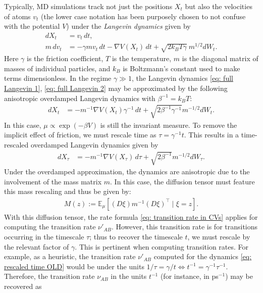 \documentclass[reqno, 12pt]{article}
\begin{document}
Typically, MD simulations track not just the positions $X_t$ but also the velocities of atoms $v_t$ (the lower case notation has been purposely chosen to not confuse with the potential $V$) under the \emph{Langevin dynamics} given by
\begin{align}
    dX_t &= v_t\,dt, \label{eq: full Langevin 1} \\
    m\,dv_t &= -\gamma m v_t\,dt {-} \nabla V(X_t)\,dt + \sqrt{{ 2}k_{B}T\gamma}\:m^{1/2}dW_t. \label{eq: full Langevin 2}
\end{align}
Here $\gamma$ is the friction coefficient, $T$ is the temperature, $m$ is the diagonal matrix of masses of individual particles, and $k_B$ is Boltzmann's constant used to make terms dimensionless. In the regime $\gamma \gg 1$, the Langevin dynamics \eqref{eq: full Langevin 1}, \eqref{eq: full Langevin 2} may be approximated by the following anisotropic overdamped Langevin dynamics with $\beta^{-1} = k_BT $: 
\begin{align}
    dX_t &= {-} m^{-1}\nabla V(X_t)\gamma^{-1}\,dt + \sqrt{2\beta^{-1} \gamma^{-1}}m^{-1/2}dW_t. 
\end{align}
In this case, $\mu \propto \exp(-\beta V)$ is still the invariant measure. To remove the implicit effect of friction, we must rescale time as $\tau = \gamma^{-1}t$. This results in a time-rescaled overdamped Langevin dynamics given by
\begin{align}
    dX_{\tau} &= {-}m^{-1}\nabla V(X_{\tau})\,d\tau + \sqrt{{ 2}\beta^{-1}}m^{-1/2}dW_{\tau}. \label{eq: rescaled time OLD}
\end{align}
Under the overdamped approximation, the dynamics are anisotropic due to the involvement of the mass matrix $m$. In this case, the diffusion tensor must feature this mass rescaling \cite[Eq. 5]{cameron2013estimation} and thus be given by: 
\begin{align}
    M(z) := \mathbb{E}_{\mu}[(D\xi) m^{-1}(D\xi)^{\top} \mid \xi = z].
\end{align}
With this diffusion tensor, the rate formula \eqref{eq: transition rate in CVs} applies for computing the transition rate $\nu'_{AB}$. However, this transition rate is for transitions occurring in the timescale $\tau$; thus to recover the timescale $t$, we must rescale by the relevant factor of $\gamma$. This is pertinent when computing transition rates. For example, as a heuristic, the transition rate $\nu'_{AB}$ computed for the dynamics \eqref{eq: rescaled time OLD} would be under the units $1/\tau = \gamma/t \iff t^{-1} = \gamma^{-1}\tau^{-1}$. Therefore, the transition rate $\nu_{AB}$ in the units $t^{-1}$ (for instance, in ps$^{-1}$) may be recovered as
\end{document}
